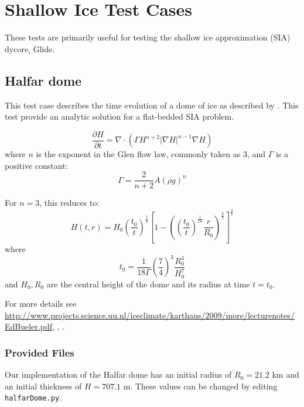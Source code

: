 
\section{Shallow Ice Test Cases}

These tests are primarily useful for testing the shallow ice approximation (SIA) dycore, Glide.


\subsection{Halfar dome}

\label{sec:halfar_description}
This test case describes the time evolution of a dome of ice as described by \citet{Halfar1983}.
This test provide an analytic solution for a flat-bedded SIA problem.

\begin{equation}
    \label{halfar}
    \frac{\partial H}{\partial t} = \nabla \cdot (\Gamma H^{n+2} |\nabla H|^{n-1} \nabla H)
\end{equation}
where $n$ is the exponent in the Glen flow law, commonly taken as 3, and $\Gamma$ is a positive constant:
\begin{equation}
    \Gamma = \frac{2}{n+2} A (\rho g)^n
\end{equation}

For $n=3$, this reduces to:
\begin{equation}
    H(t,r) = H_0 \left(\frac{t_0}{t}\right)^\frac{1}{9}  \left[ 1 - \left(  \left( \frac{t_0}{t} \right) ^ \frac{1}{18} \frac{r}{R_0} \right)^\frac{4}{3} \right] ^ \frac{3}{7}
\end{equation}
where
\begin{equation}
    t_0 = \frac{1}{18\Gamma} \left( \frac{7}{4} \right)^3 \frac{R_0^4}{H_0^7}
\end{equation}
and $H_0, R_0$ are the central height of the dome and its radius at time $t=t_0$.

For more details see \url{http://www.projects.science.uu.nl/iceclimate/karthaus/2009/more/lecturenotes/EdBueler.pdf},  \citet{Bueler2005}, \citet{Halfar1983}.



\subsubsection{Provided Files}
\label{subsec:halfar_files}

Our implementation of the Halfar dome has an initial radius of $R_0=21.2$ km and an initial thickness of $H=707.1$ m.
These values can be changed by editing \texttt{halfarDome.py}.

